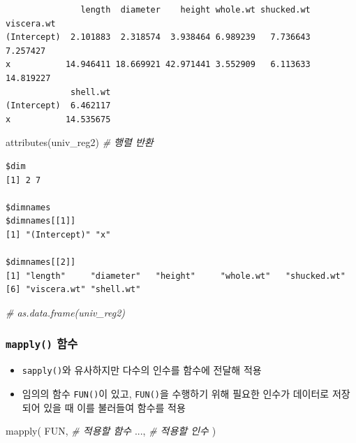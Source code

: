 \documentclass[
  11pt,
]{krantz}
\newenvironment{Shaded}{\begin{snugshade}}{\end{snugshade}}
\newcommand{\CommentTok}[1]{\textcolor[rgb]{0.37,0.37,0.37}{\textit{#1}}}
\newcommand{\FunctionTok}[1]{\textcolor[rgb]{0,0,0}{#1}}
\newcommand{\NormalTok}[1]{#1}
\providecommand{\tightlist}{%
  \setlength{\itemsep}{0pt}\setlength{\parskip}{0pt}}
\begin{document}
\begin{verbatim}
               length  diameter    height whole.wt shucked.wt viscera.wt
(Intercept)  2.101883  2.318574  3.938464 6.989239   7.736643   7.257427
x           14.946411 18.669921 42.971441 3.552909   6.113633  14.819227
             shell.wt
(Intercept)  6.462117
x           14.535675
\end{verbatim}

\begin{Shaded}
\begin{Highlighting}[]
\FunctionTok{attributes}\NormalTok{(univ\_reg2) }\CommentTok{\# 행렬 반환}
\end{Highlighting}
\end{Shaded}

\begin{verbatim}
$dim
[1] 2 7

$dimnames
$dimnames[[1]]
[1] "(Intercept)" "x"          

$dimnames[[2]]
[1] "length"     "diameter"   "height"     "whole.wt"   "shucked.wt"
[6] "viscera.wt" "shell.wt"  
\end{verbatim}

\begin{Shaded}
\begin{Highlighting}[]
\CommentTok{\# as.data.frame(univ\_reg2)}
\end{Highlighting}
\end{Shaded}

\normalsize

\hypertarget{mapply}{%
\subsubsection*{\texorpdfstring{\texttt{mapply()} 함수}{mapply() 함수}}\label{mapply}}


\begin{itemize}
\tightlist
\item
  \texttt{sapply()}와 유사하지만 다수의 인수를 함수에 전달해 적용
\item
  임의의 함수 \texttt{FUN()}이 있고, \texttt{FUN()}을 수행하기 위해 필요한 인수가 데이터로 저장되어 있을 때 이를 불러들여 함수를 적용
\end{itemize}

\footnotesize

\begin{Shaded}
\begin{Highlighting}[]
\FunctionTok{mapply}\NormalTok{(}
\NormalTok{  FUN, }\CommentTok{\# 적용할 함수}
\NormalTok{  ..., }\CommentTok{\# 적용할 인수}
\NormalTok{)}
\end{Highlighting}
\end{Shaded}
\end{document}
